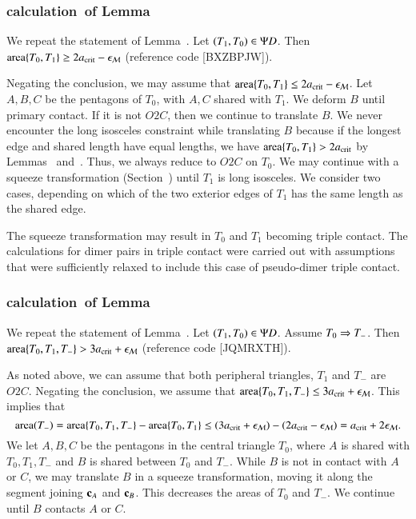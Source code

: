 \subsubsection{calculation~of Lemma~} 

We repeat the statement of Lemma~.
Let $(T_1,T_0)\in\Psi D$.  Then ${\operatorname{area}}\{T_0,T_1\} \ge 2a_\text{crit} - \epsilon_{\mathcal M}$
(reference code [BXZBPJW]).

Negating the conclusion, we may assume that ${\operatorname{area}}\{T_0,T_1\}\le
2a_\text{crit} - \epsilon_{\mathcal M}$.  Let $A,B,C$ be the pentagons of $T_0$, with $A,C$
shared with $T_1$.  We deform $B$ until primary contact.  If it is not
$O2C$, then we continue to translate $B$.  We never encounter the long
isosceles constraint while translating $B$ because if the longest edge
and shared length have equal lengths, we have ${\operatorname{area}}\{T_0,T_1\} >
2a_\text{crit}$ by Lemmas~ and~.  Thus,
we always reduce to $O2C$ on $T_0$.  We may continue with a squeeze
transformation (Section~) until $T_1$ is long
isosceles.  We consider two cases, depending on which of the two
exterior edges of $T_1$ has the same length as the shared edge.

The squeeze transformation may result in $T_0$ and $T_1$ becoming
triple contact.  The calculations for dimer pairs in triple contact
were carried out with assumptions that were sufficiently relaxed to
include this case of pseudo-dimer triple contact.

\subsubsection{calculation~of Lemma~}

We repeat the statement of Lemma~.  Let
$(T_1,T_0)\in\Psi D$. Assume $T_0\Rightarrow T_-$.  Then ${\operatorname{area}}\{T_0,T_1,T_-\} >
3a_\text{crit} + \epsilon_{\mathcal M}$ (reference code [JQMRXTH]).

As noted above, we can assume that both peripheral triangles, $T_1$
and $T_-$ are $O2C$.  Negating the conclusion, we assume that
${\operatorname{area}}\{T_0,T_1,T_-\}\le 3a_\text{crit}+\epsilon_{\mathcal M}$.  This implies that
\[
{\operatorname{area}}(T_-) = {\operatorname{area}}\{T_0,T_1,T_-\} - {\operatorname{area}}\{T_0,T_1\} 
\le (3a_\text{crit}+\epsilon_{\mathcal M}) - (2a_\text{crit} - \epsilon_{\mathcal M}) = a_\text{crit} + 2\epsilon_{\mathcal M}.
\]
We let $A,B,C$ be the pentagons in the central triangle $T_0$, where
$A$ is shared with $T_0,T_1,T_-$ and $B$ is shared between $T_0$ and
$T_-$.  While $B$ is not in contact with $A$ or $C$, we may translate
$B$ in a squeeze transformation, moving it along the segment joining
${\mathbf c}_A$ and ${\mathbf c}_B$.  This decreases the areas of $T_0$ and $T_-$.  We
continue until $B$ contacts $A$ or $C$.

